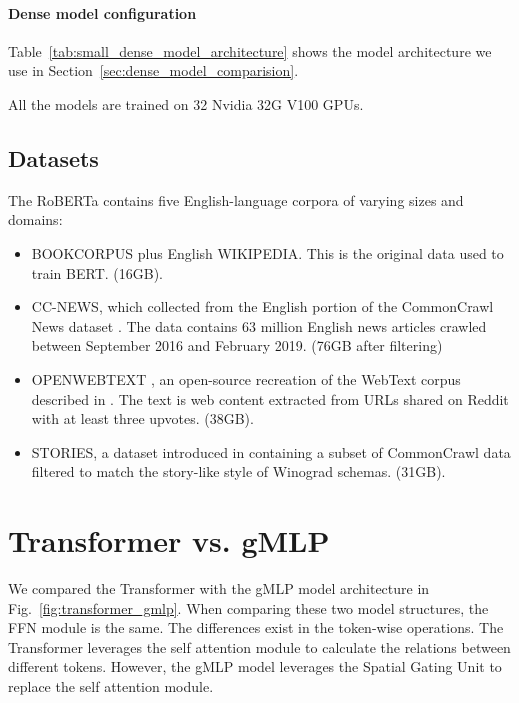 \documentclass{article}
\begin{document}
\paragraph{Dense model configuration} Table~\ref{tab:small_dense_model_architecture} shows the model architecture we use in Section~\ref{sec:dense_model_comparision}.

All the models are trained on 32 Nvidia 32G V100 GPUs. \subsection{Datasets}
\label{sec:appendix_datasets}
The RoBERTa contains five English-language corpora of varying sizes and domains:
\begin{itemize}
\item BOOKCORPUS \citep{zhu2015aligning} plus English WIKIPEDIA. This is the original data used to train BERT. (16GB).
\item CC-NEWS, which collected from the English portion of the CommonCrawl News dataset \citep{ccnews}. The data contains 63 million English news articles crawled between
September 2016 and February 2019. (76GB after filtering)
\item OPENWEBTEXT \citep{openweb}, an open-source recreation of the WebText corpus described in \citep{radford2019language}. The text is web content extracted from URLs shared on Reddit with at least three upvotes. (38GB).
\item STORIES, a dataset introduced in \citep{trinh2018simple} containing a subset of CommonCrawl
data filtered to match the story-like style of
Winograd schemas. (31GB).
\end{itemize}










\section{Transformer vs. gMLP}
We compared the Transformer \citep{transformer2017} with the gMLP \citep{gmlp} model architecture in Fig.~\ref{fig:transformer_gmlp}. When comparing these two model structures, the FFN module is the same. The differences exist in the token-wise operations. The Transformer leverages the self attention module to calculate the relations between different tokens. However, the gMLP model leverages the Spatial Gating Unit to replace the self attention module.
\end{document}

